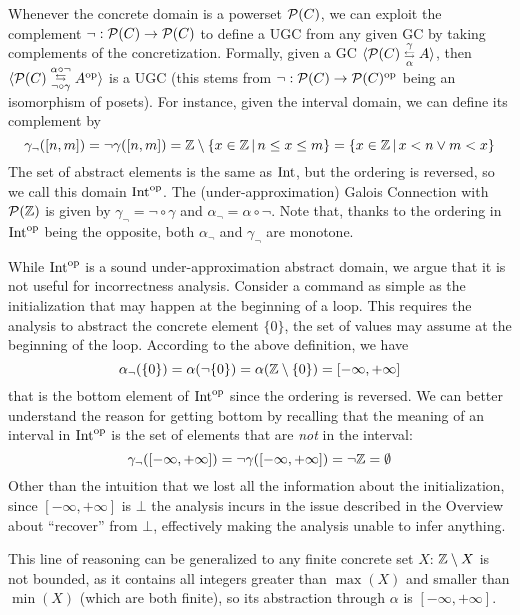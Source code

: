 \begin{example}\label{ex:uai:complement-domain}
	Whenever the concrete domain is a powerset $\mathcal{P}(C)$, we can exploit the complement $\lnot : \mathcal{P}(C) \rightarrow \mathcal{P}(C)$ to define a UGC from any given GC by taking complements of the concretization. Formally, given a GC $\langle \mathcal{P}(C) \mathrel{\substack{\gamma \\ \leftrightarrows \\ \alpha}} A\rangle$, then $\langle \mathcal{P}(C) \mathrel{\substack{\alpha \circ \lnot \\ \leftrightarrows \\ \lnot \circ \gamma}} A^{\text{op}}\rangle$ is a UGC (this stems from $\lnot : \mathcal{P}(C) \rightarrow \mathcal{P}(C)^{\text{op}}$ being an isomorphism of posets).
	For instance, given the interval domain, we can define its complement by
	\[
	\gamma_{\lnot}([n, m]) = \lnot \gamma([n, m]) = \mathbb{Z} \setminus \{ x \in  \mathbb{Z} \,\vert\, n \le x \le m \} = \{ x \in \mathbb{Z} \,\vert\, x < n \lor m < x \}
	\]
	The set of abstract elements is the same as $\text{Int}$, but the ordering is reversed, so we call this domain $\text{Int}^{\text{op}}$. The (under-approximation) Galois Connection with $\mathcal{P}(\mathbb{Z})$ is given by $\gamma_{\lnot} = \lnot \circ \gamma$ and $\alpha_{\lnot} = \alpha \circ \lnot$. Note that, thanks to the ordering in $\text{Int}^{\text{op}}$ being the opposite, both $\alpha_{\lnot}$ and $\gamma_{\lnot}$ are monotone.

	While $\text{Int}^{\text{op}}$ is a sound under-approximation abstract domain, we argue that it is not useful for incorrectness analysis. Consider a command as simple as the initialization  that may happen at the beginning of a loop. This requires the analysis to abstract the concrete element $\{ 0 \}$, the set of values  may assume at the beginning of the loop. According to the above definition, we have
	\[
	\alpha_{\lnot}(\{ 0 \}) = \alpha(\lnot \{ 0 \}) = \alpha(\mathbb{Z} \setminus \{ 0 \}) = [-\infty, +\infty]
	\]
	that is the bottom element of $\text{Int}^{\text{op}}$ since the ordering is reversed. We can better understand the reason for getting bottom by recalling that the meaning of an interval in $\text{Int}^{\text{op}}$ is the set of elements that are \emph{not} in the interval:
	\[
	\gamma_{\lnot}([-\infty, +\infty]) = \lnot \gamma([-\infty, +\infty]) = \lnot \mathbb{Z} = \emptyset
	\]
	Other than the intuition that we lost all the information about the initialization, since $[-\infty, +\infty]$ is $\bot$ the analysis incurs in the issue described in the Overview about ``recover'' from $\bot$, effectively making the analysis unable to infer anything.

	This line of reasoning can be generalized to any finite concrete set $X$: $\mathbb{Z} \setminus X$ is not bounded, as it contains all integers greater than $\max(X)$ and smaller than $\min(X)$ (which are both finite), so its abstraction through $\alpha$ is $[-\infty, +\infty]$.
\end{example}

